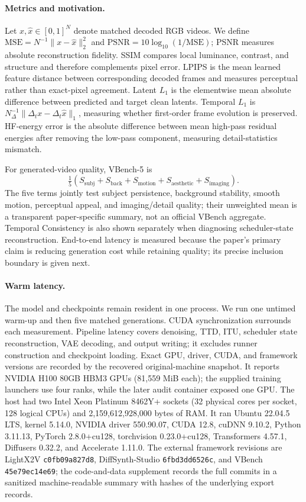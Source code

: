 \documentclass[letterpaper]{article}
\begin{document}
\paragraph{Metrics and motivation.}
Let \(x,\hat{x}\in[0,1]^N\) denote matched decoded RGB videos.  We define
\(\mathrm{MSE}=N^{-1}\lVert x-\hat{x}\rVert_2^2\) and
\(\mathrm{PSNR}=10\log_{10}(1/\mathrm{MSE})\); PSNR measures absolute
reconstruction fidelity.  SSIM compares local luminance, contrast, and
structure and therefore complements pixel error.  LPIPS is the mean learned
feature distance between corresponding decoded frames and measures perceptual
rather than exact-pixel agreement.  Latent \(L_1\) is the elementwise mean
absolute difference between predicted and target clean latents.  Temporal
\(L_1\) is
\(N_{\Delta}^{-1}\lVert\Delta_t x-\Delta_t\hat{x}\rVert_1\), measuring whether
first-order frame evolution is preserved.  HF-energy error is the absolute
difference between mean high-pass residual energies after removing the
low-pass component, measuring detail-statistics mismatch.

For generated-video quality, VBench-5 is
\[
 \tfrac15(S_{\mathrm{subj}}+S_{\mathrm{back}}+S_{\mathrm{motion}}
             +S_{\mathrm{aesthetic}}+S_{\mathrm{imaging}}).
\]
The five terms jointly test subject persistence, background stability, smooth
motion, perceptual appeal, and imaging/detail quality; their unweighted mean is
a transparent paper-specific summary, not an official VBench aggregate.
Temporal Consistency is also shown separately when diagnosing scheduler-state
reconstruction.  End-to-end latency is measured because the paper's primary
claim is reducing generation cost while retaining quality; its precise
inclusion boundary is given next.

\paragraph{Warm latency.}
The model and checkpoints remain resident in one process.  We run one untimed
warm-up and then five matched generations.  CUDA synchronization surrounds
each measurement.  Pipeline latency covers denoising, TTD, ITU, scheduler
state reconstruction, VAE decoding, and output writing; it excludes runner
construction and checkpoint loading.  Exact GPU, driver, CUDA, and framework
versions are recorded by the recovered original-machine snapshot.  It reports
NVIDIA H100 80GB HBM3 GPUs (81,559 MiB each); the supplied training launchers
use four ranks, while the later audit container exposed one GPU.  The host had
two Intel Xeon Platinum 8462Y+ sockets (32 physical cores per socket, 128
logical CPUs) and 2,159,612,928,000 bytes of RAM.  It ran Ubuntu 22.04.5 LTS,
kernel 5.14.0, NVIDIA driver 550.90.07, CUDA 12.8, cuDNN 9.10.2, Python
3.11.13, PyTorch 2.8.0+cu128, torchvision 0.23.0+cu128, Transformers 4.57.1,
Diffusers 0.32.2, and Accelerate 1.11.0.  The external framework revisions are
LightX2V \texttt{c0fb09a827d8}, DiffSynth-Studio \texttt{6fbd3dd6526c}, and
VBench \texttt{45e79ec14e69}; the code-and-data supplement records the full
commits in a sanitized machine-readable summary with hashes of the underlying
export records.
\end{document}
